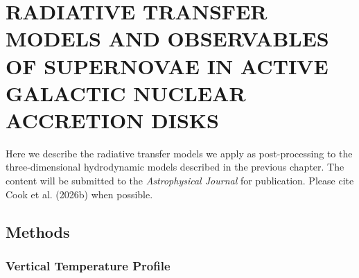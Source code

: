 \section{\texorpdfstring{\MakeUppercase{radiative transfer models and observables of supernovae in active galactic nuclear accretion disks}}{radiative transfer models and observables of supernovae in active galactic nuclear accretion disks}}
\label{sec:sn-rt}



Here we describe the radiative transfer models we apply as post-processing to the three-dimensional hydrodynamic models described in the previous chapter.
The content will be submitted to the \textit{Astrophysical Journal} for publication.
Please cite Cook et al. (2026b) when possible.


\subsection{Methods} \label{sec:methods}


\subsubsection{Vertical Temperature Profile} \label{subsec:temperature-profile}

